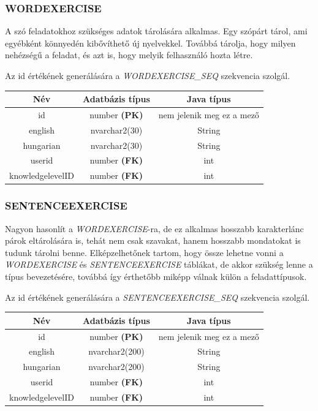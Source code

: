 \documentclass[11pt, a4paper]{article}
\begin{document}
    \subsubsection{WORDEXERCISE}
    A szó feladatokhoz szükséges adatok tárolására alkalmas. Egy szópárt tárol, ami egyébként könnyedén kibővíthető új nyelvekkel. Továbbá tárolja, hogy milyen nehézségű a feladat, és azt is, hogy melyik felhasználó hozta létre.
    
    Az id értékének generálására a \textit{WORDEXERCISE\_SEQ} szekvencia szolgál.
    
    \begin{table}[!h]
    	\centering
    	\begin{tabular} {|c|c|c|}
    		\hline
    		Név & Adatbázis típus & Java típus \\
    		\hline
    		id & number \textbf{(PK)} & nem jelenik meg ez a mező \\
    		english & nvarchar2(30) & String \\
    		hungarian & nvarchar2(30) & String \\
    		userid & number \textbf{(FK)} & int \\
    		knowledgelevelID & number \textbf{(FK)} & int \\
    		\hline
    	\end{tabular}
    \end{table}
    
    \subsubsection{SENTENCEEXERCISE}
    Nagyon hasonlít a \textit{WORDEXERCISE}-ra, de ez alkalmas hosszabb karakterlánc párok eltárolására is, tehát nem csak szavakat, hanem hosszabb mondatokat is tudunk tárolni benne. Elképzelhetőnek tartom, hogy össze lehetne vonni a \textit{WORDEXERCISE} és \textit{SENTENCEEXERCISE} táblákat, de akkor szükség lenne a típus bevezetésére, továbbá így érthetőbb miképp válnak külön a feladattípusok.
    
    Az id értékének generálására a \textit{SENTENCEEXERCISE\_SEQ} szekvencia szolgál.
    
    \begin{table}[!h]
    	\centering
    	\begin{tabular} {|c|c|c|}
    		\hline
    		Név & Adatbázis típus & Java típus \\
    		\hline
    		id & number \textbf{(PK)} & nem jelenik meg ez a mező \\
    		english & nvarchar2(200) & String \\
    		hungarian & nvarchar2(200) & String \\
    		userid & number \textbf{(FK)} & int \\
    		knowledgelevelID & number \textbf{(FK)} & int \\
    		\hline
    	\end{tabular}
    \end{table}
    
\end{document}
